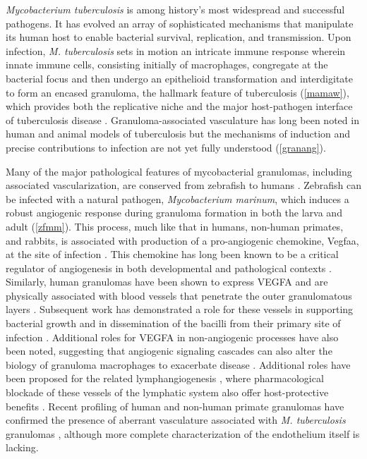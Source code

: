 \textit{Mycobacterium tuberculosis} is among history's most widespread and successful pathogens. It has evolved an array of sophisticated mechanisms that manipulate its human host to enable bacterial survival, replication, and transmission. Upon infection, \textit{M. tuberculosis} sets in motion an intricate immune response wherein innate immune cells, consisting initially of macrophages, congregate at the bacterial focus and then undergo an epithelioid transformation and interdigitate to form an encased granuloma, the hallmark feature of tuberculosis (\autoref{mamaw}), which provides both the replicative niche and the major host\hyp{}pathogen interface of tuberculosis disease \citep{Cronan2016, Pagan2018, Cronan2021}. Granuloma\hyp{}associated vasculature has long been noted in human and animal models of tuberculosis \citep{Cudkowicz1952, Russell2010} but the mechanisms of induction and precise contributions to infection are not yet fully understood (\autoref{granang}).

Many of the major pathological features of mycobacterial granulomas, including associated vascularization, are conserved from zebrafish to humans \citep{Swaim2006, Bohrer2021}. Zebrafish can be infected with a natural pathogen, \textit{Mycobacterium marinum}, which induces a robust angiogenic response during granuloma formation in both the larva and adult (\autoref{zfmm}). This process, much like that in humans, non\hyp{}human primates, and rabbits, is associated with production of a pro\hyp{}angiogenic chemokine, Vegfaa, at the site of infection \citep{Oehlers2015}. This chemokine has long been known to be a critical regulator of angiogenesis in both developmental and pathological contexts \citep{Leung1989, Adams2007, Chung2011}. Similarly, human granulomas have been shown to express VEGFA and are physically associated with blood vessels that penetrate the outer granulomatous layers \citep{Guirado2013b, Datta2015}. Subsequent work has demonstrated a role for these vessels in supporting bacterial growth and in dissemination of the bacilli from their primary site of infection \citep{Polena2016}. Additional roles for VEGFA in non\hyp{}angiogenic processes have also been noted, suggesting that angiogenic signaling cascades can also alter the biology of granuloma macrophages to exacerbate disease \citep{Harding2019}. Additional roles have been proposed for the related lymphangiogenesis \citep{Alitalo2005, Duong2012, Lerner2020}, where pharmacological blockade of these vessels of the lymphatic system also offer host\hyp{}protective benefits \citep{Harding2015}. Recent profiling of human and non\hyp{}human primate granulomas have confirmed the presence of aberrant vasculature associated with \textit{M. tuberculosis} granulomas \citep{Cronan2021, Gideon2022, McCaffrey2022}, although more complete characterization of the endothelium itself is lacking.

